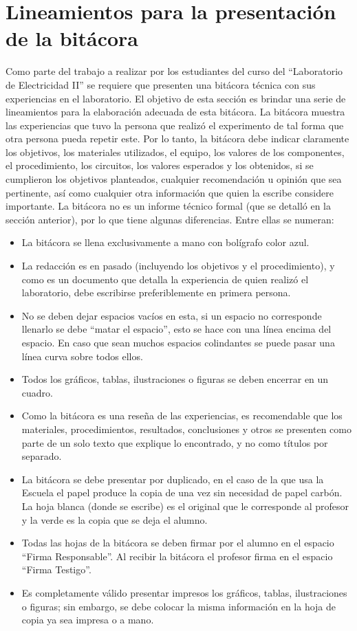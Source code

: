 \documentclass{report}
\begin{document}
\chapter{Lineamientos para la presentación de la bitácora}
Como parte del trabajo a realizar por los estudiantes del curso del “Laboratorio de
Electricidad II” se requiere que presenten una bitácora técnica con sus
experiencias en el laboratorio. El objetivo de esta sección es brindar una serie de
lineamientos para la elaboración adecuada de esta bitácora.
La bitácora muestra las experiencias que tuvo la persona que realizó el
experimento de tal forma que otra persona pueda repetir este. Por lo tanto, la
bitácora debe indicar claramente los objetivos, los materiales utilizados, el equipo,
los valores de los componentes, el procedimiento, los circuitos, los valores
esperados y los obtenidos, si se cumplieron los objetivos planteados, cualquier
recomendación u opinión que sea pertinente, así como cualquier otra información
que quien la escribe considere importante.
La bitácora no es un informe técnico formal (que se detalló en la sección anterior),
por lo que tiene algunas diferencias. Entre ellas se numeran:
\begin{itemize}
\item La bitácora se llena exclusivamente a mano con bolígrafo color azul.
\item La redacción es en pasado (incluyendo los objetivos y el procedimiento), y
como es un documento que detalla la experiencia de quien realizó el
laboratorio, debe escribirse preferiblemente en primera persona.
\item No se deben dejar espacios vacíos en esta, si un espacio no corresponde
llenarlo se debe “matar el espacio”, esto se hace con una línea encima del
espacio. En caso que sean muchos espacios colindantes se puede pasar
una línea curva sobre todos ellos.
\item Todos los gráficos, tablas, ilustraciones o figuras se deben encerrar en un
cuadro.
\item Como la bitácora es una reseña de las experiencias, es recomendable que
los materiales, procedimientos, resultados, conclusiones y otros se
presenten como parte de un solo texto que explique lo encontrado, y no
como títulos por separado.
\item La bitácora se debe presentar por duplicado, en el caso de la que usa la
Escuela el papel produce la copia de una vez sin necesidad de papel
carbón. La hoja blanca (donde se escribe) es el original que le corresponde
al profesor y la verde es la copia que se deja el alumno.
\item Todas las hojas de la bitácora se deben firmar por el alumno en el espacio
“Firma Responsable”. Al recibir la bitácora el profesor firma en el espacio
“Firma Testigo”.
\item Es completamente válido presentar impresos los gráficos, tablas,
ilustraciones o figuras; sin embargo, se debe colocar la misma información
en la hoja de copia ya sea impresa o a mano.
\end{itemize}
\end{document}
